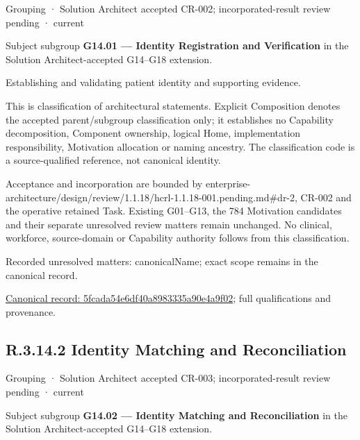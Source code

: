 \label{element:5fcada54e6df40a8983335a90e4a9f02}
{\small Grouping · Solution Architect accepted CR-002; incorporated-result review pending · current}\par

Subject subgroup \textbf{G14.01 — Identity Registration and Verification} in the Solution Architect-accepted G14–G18 extension.



Establishing and validating patient identity and supporting evidence.



This is classification of architectural statements. Explicit Composition denotes the accepted parent/subgroup classification only; it establishes no Capability decomposition, Component ownership, logical Home, implementation responsibility, Motivation allocation or naming ancestry. The classification code is a source-qualified reference, not canonical identity.



Acceptance and incorporation are bounded by enterprise-architecture/design/review/1.1.18/hcrl-1.1.18-001.pending.md\#dr-2, CR-002 and the operative retained Task. Existing G01–G13, the 784 Motivation candidates and their separate unresolved review matters remain unchanged. No clinical, workforce, source-domain or Capability authority follows from this classification.


{\small Recorded unresolved matters: canonicalName; exact scope remains in the canonical record.}\par
{\footnotesize \href{../../../../continuum/grouping/5fcada54e6df40a8983335a90e4a9f02.md}{Canonical record: 5fcada54e6df40a8983335a90e4a9f02}; full qualifications and provenance.}\par
\subsection*{R.3.14.2 Identity Matching and Reconciliation}
\label{navigation:R.3.14.2}

\label{element:b91ec2110aaf4d44bd043bb787fbd910}
{\small Grouping · Solution Architect accepted CR-003; incorporated-result review pending · current}\par

Subject subgroup \textbf{G14.02 — Identity Matching and Reconciliation} in the Solution Architect-accepted G14–G18 extension.



